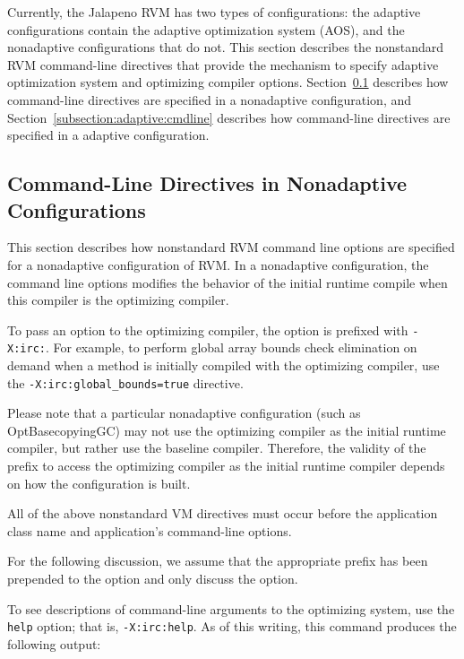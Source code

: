 
Currently, the Jalapeno RVM has two types of configurations:
the adaptive configurations contain the adaptive optimization system (AOS),
and the nonadaptive configurations that do not.  
This section describes the nonstandard RVM command-line directives that 
provide the mechanism to specify adaptive optimization system and optimizing
compiler options.
Section~\ref{subsection:nonadaptive:cmdline} describes how command-line 
directives are specified in a nonadaptive configuration, and 
Section~\ref{subsection:adaptive:cmdline} describes how command-line 
directives are specified in a adaptive configuration.

\subsection{Command-Line Directives in Nonadaptive Configurations}
\label{subsection:nonadaptive:cmdline}

This section describes how nonstandard RVM command line options are 
specified for a nonadaptive configuration of RVM.
In a nonadaptive configuration, the command line options modifies
the behavior of the initial runtime compile when this compiler
is the optimizing compiler.

To pass an option to the optimizing compiler, the option is prefixed
with {\tt -X:irc:}.
For example, to perform global array bounds check elimination on demand
when a method is initially compiled with the optimizing compiler,
use the {\tt -X:irc:global\_bounds=true} directive.

Please note that a particular nonadaptive configuration (such as
OptBasecopyingGC) may not use the 
optimizing compiler as the initial runtime compiler, but rather use the 
baseline compiler.
Therefore, the validity of the prefix to access the optimizing compiler
as the initial runtime compiler depends on how the configuration is built.

All of the above nonstandard VM directives must occur before 
the application class name and application's command-line options.

For the following discussion, we assume that the appropriate prefix has been
prepended to the option and only discuss the option.

To see descriptions of command-line arguments to the optimizing system, use
the {\tt help} option; that is, {\tt -X:irc:help}.  
As of this writing, this command produces the following output:



